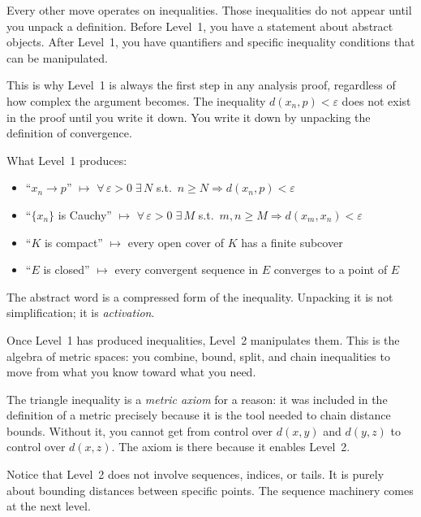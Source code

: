 \begin{remark}
Every other move operates on inequalities. Those inequalities do not
appear until you unpack a definition. Before Level~1, you have a
statement about abstract objects. After Level~1, you have quantifiers
and specific inequality conditions that can be manipulated.

This is why Level~1 is always the first step in any analysis proof,
regardless of how complex the argument becomes. The inequality
$d(x_n, p) < \varepsilon$ does not exist in the proof until you write
it down. You write it down by unpacking the definition of convergence.

What Level~1 produces:
\begin{itemize}[itemsep=2pt]
  \item ``$x_n \to p$'' $\mapsto$ $\forall\,\varepsilon>0\;\exists\,N$
    s.t.\ $n \geq N \Rightarrow d(x_n, p) < \varepsilon$
  \item ``$\{x_n\}$ is Cauchy'' $\mapsto$ $\forall\,\varepsilon>0\;\exists\,M$
    s.t.\ $m,n \geq M \Rightarrow d(x_m, x_n) < \varepsilon$
  \item ``$K$ is compact'' $\mapsto$ every open cover of $K$ has a finite subcover
  \item ``$E$ is closed'' $\mapsto$ every convergent sequence in $E$ converges
    to a point of $E$
\end{itemize}
The abstract word is a compressed form of the inequality. Unpacking
it is not simplification; it is \emph{activation}.
\end{remark}

\begin{remark}
Once Level~1 has produced inequalities, Level~2 manipulates them.
This is the algebra of metric spaces: you combine, bound, split, and
chain inequalities to move from what you know toward what you need.

The triangle inequality is a \emph{metric axiom} for a reason: it was
included in the definition of a metric precisely because it is the tool
needed to chain distance bounds. Without it, you cannot get from control
over $d(x,y)$ and $d(y,z)$ to control over $d(x,z)$. The axiom is there
because it enables Level~2.

Notice that Level~2 does not involve sequences, indices, or tails.
It is purely about bounding distances between specific points. The
sequence machinery comes at the next level.
\end{remark}

